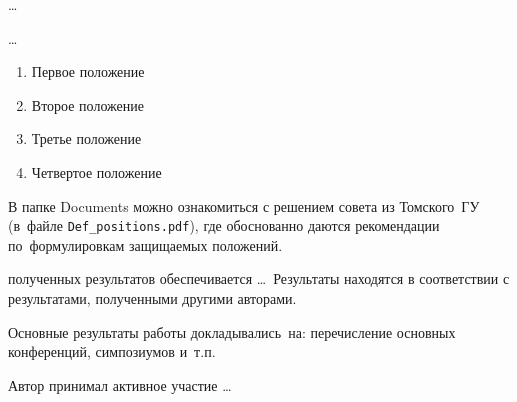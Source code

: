 {\influence} \ldots

{\methods} \ldots

{}
\begin{enumerate}[beginpenalty=10000] %
  \item Первое положение
  \item Второе положение
  \item Третье положение
  \item Четвертое положение
\end{enumerate}
В папке Documents можно ознакомиться с решением совета из Томского~ГУ
(в~файле \verb+Def_positions.pdf+), где обоснованно даются рекомендации
по~формулировкам защищаемых положений.

{\reliability} полученных результатов обеспечивается \ldots \ Результаты находятся в соответствии с результатами, полученными другими авторами.


{\probation}
Основные результаты работы докладывались~на:
перечисление основных конференций, симпозиумов и~т.\:п.

{\contribution} Автор принимал активное участие \ldots

